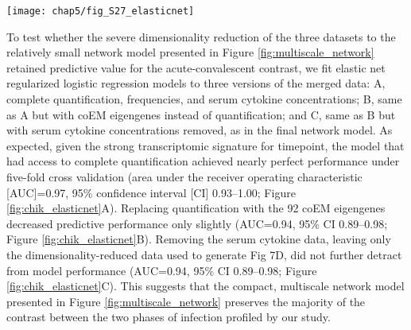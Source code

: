 \begin{figure*}[htb]
  \centering
  \texttt{[image: chap5/fig\_S27\_elasticnet]}
  \caption[Performance of elastic net regression models for predicting timepoint]{
  \textbf{Receiver operator characteristic (ROC) curves measuring the performance of elastic net logistic regression models predicting the phase of infection} (acute vs. convalescent) for each sample, using progressively reduced versions of the dataset. Thin grey lines show the ROC curves for 100 bootstrap replicates. The area under the curve (AUC) along with its 95\% confidence interval are shown underneath each plot; a perfect classifier would achieve AUC=1 while a random classifier is expected to achieve AUC=0.5 (dashed diagonal line). A, model trained using all CyTOF sub-community frequencies, all quantified RNA-seq transcripts, and all Luminex cytokine measurements achieves near-perfect performance. B, model trained as in A but with eigengene values for 92 coexpression modules replacing the RNA-seq transcript-level quantification; performance is slightly decreased but remains within the confidence interval for A’s AUC. C, model trained as in B but without Luminex cytokine measurements; performance is equivalent to the model trained in B.
  }
  \label{fig:chik_elasticnet}
\end{figure*}

To test whether the severe dimensionality reduction of the three datasets to the relatively small network model presented in Figure \ref{fig:multiscale_network} retained predictive value for the acute-convalescent contrast, we fit elastic net regularized logistic regression models to three versions of the merged data: A, complete \pertranscript{} quantification, \subcommunity{} frequencies, and serum cytokine concentrations; B, same as A but with coEM eigengenes instead of \pertranscript{} quantification; and C, same as B but with serum cytokine concentrations removed, as in the final network model. As expected, given the strong transcriptomic signature for timepoint, the model that had access to complete \pertranscript{} quantification achieved nearly perfect performance under five-fold cross validation (area under the receiver operating characteristic [AUC]=0.97, 95\% confidence interval [CI] 0.93–1.00; Figure \ref{fig:chik_elasticnet}A). Replacing \pertranscript{} quantification with the 92 coEM eigengenes decreased predictive performance only slightly (AUC=0.94, 95\% CI 0.89–0.98; Figure \ref{fig:chik_elasticnet}B). Removing the serum cytokine data, leaving only the dimensionality-reduced data used to generate Fig 7D, did not further detract from model performance (AUC=0.94, 95\% CI 0.89–0.98; Figure \ref{fig:chik_elasticnet}C). This suggests that the compact, multiscale network model presented in Figure \ref{fig:multiscale_network} preserves the majority of the contrast between the two phases of infection profiled by our study.

